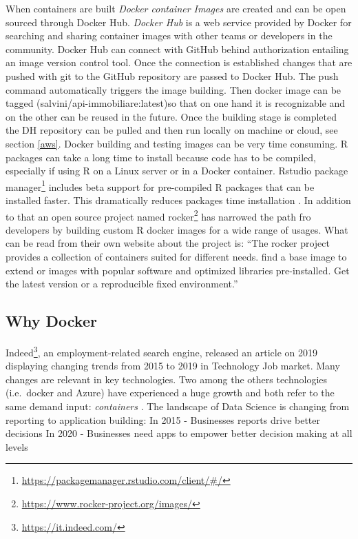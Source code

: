 \documentclass[
  12pt,
  a4paper,
  oneside]{book}
\DeclareRobustCommand{\href}[2]{#2\footnote{\url{#1}}}
\begin{document}
When containers are built \emph{Docker container Images} are created and can be open sourced through Docker Hub.
\emph{Docker Hub} is a web service provided by Docker for searching and sharing container images with other teams or developers in the community. Docker Hub can connect with GitHub behind authorization entailing an image version control tool. Once the connection is established changes that are pushed with git to the GitHub repository are passed to Docker Hub. The push command automatically triggers the image building. Then docker image can be tagged (salvini/api-immobiliare:latest)so that on one hand it is recognizable and on the other can be reused in the future. Once the building stage is completed the DH repository can be pulled and then run locally on machine or cloud, see section \ref{aws}.
Docker building and testing images can be very time consuming. R packages can take a long time to install because code has to be compiled, especially if using R on a Linux server or in a Docker container.
Rstudio \href{https://packagemanager.rstudio.com/client/\#/}{package manager} includes beta support for pre-compiled R packages that can be installed faster. This dramatically reduces packages time installation \citep{nolis_2020}.
In addition to that an open source project named \href{https://www.rocker-project.org/images/}{rocker} has narrowed the path fro developers by building custom R docker images for a wide range of usages. What can be read from their own website about the project is: ``The rocker project provides a collection of containers suited for different needs. find a base image to extend or images with popular software and optimized libraries pre-installed. Get the latest version or a reproducible fixed environment.''

\hypertarget{why-docker}{%
\subsection{Why Docker}\label{why-docker}}

\href{https://it.indeed.com/}{Indeed}, an employment-related search engine, released an article on 2019 displaying changing trends from 2015 to 2019 in Technology Job market. Many changes are relevant in key technologies. Two among the others technologies (i.e.~docker and Azure) have experienced a huge growth and both refer to the same demand input: \emph{containers} .
The landscape of Data Science is changing \citep{Skills_Explorer} from reporting to application building:
In 2015 - Businesses reports drive better decisions
In 2020 - Businesses need apps to empower better decision making at all levels
\end{document}
